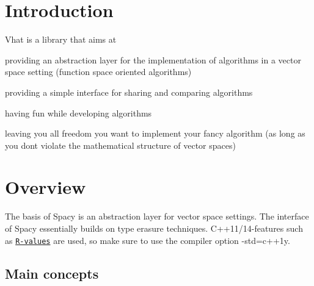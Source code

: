 \hypertarget{index_sec_intro}{}\section{Introduction}\label{index_sec_intro}
Vhat is a library that aims at
\begin{DoxyItemize}
\item providing an abstraction layer for the implementation of algorithms in a vector space setting (function space oriented algorithms)
\item providing a simple interface for sharing and comparing algorithms
\item having fun while developing algorithms
\item leaving you all freedom you want to implement your fancy algorithm (as long as you don\textquotesingle{}t violate the mathematical structure of vector spaces)
\end{DoxyItemize}\hypertarget{index_sec_overview}{}\section{Overview}\label{index_sec_overview}
The basis of Spacy is an abstraction layer for vector space settings. The interface of Spacy essentially builds on type erasure techniques. C++11/14-\/features such as \href{http://en.cppreference.com/w/cpp/language/value_category}{\tt R-\/values} are used, so make sure to use the compiler option -\/std=c++1y.\hypertarget{index_sub_concepts}{}\subsection{Main concepts}\label{index_sub_concepts}

